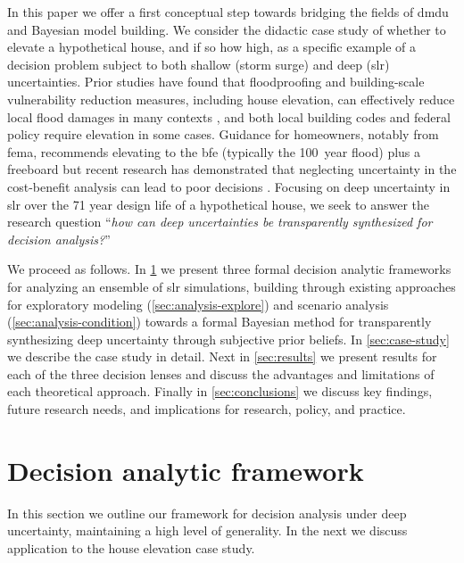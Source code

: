 \documentclass[11pt]{article}
\begin{document}
In this paper we offer a first conceptual step towards bridging the fields of \gls{dmdu} and Bayesian model building.
We consider the didactic case study of whether to elevate a hypothetical house, and if so how high, as a specific example of a decision problem subject to both shallow (storm surge) and deep (\gls{slr}) uncertainties.
Prior studies have found that floodproofing and building-scale vulnerability reduction measures, including house elevation, can effectively reduce local flood damages in many contexts \citep{demoel_reducing:2014,deruig_building:2020,kreibich_building:2005,slotter_floodproofing:2020,rozer_coping:2016,mobley_mitigation:2020,aerts_cost:2018}, and both local building codes \citep{asce_7-10:2013,bruneau_multihazard:2017,asce_24-05:2006} and federal policy \citep{FEMA_p-55:2011} require elevation in some cases.
Guidance for homeowners, notably from \gls{fema}, recommends elevating to the \gls{bfe} (typically the \SI{100}{year} flood) plus a freeboard \citep{fema_retrofitting:2014,asce_24-14:2015,fema_retrofitting:2014} but recent research has demonstrated that neglecting uncertainty in the cost-benefit analysis can lead to poor decisions \citep{zarekarizi_suboptimal:2020}.
Focusing on deep uncertainty in \gls{slr} over the 71 year design life of a hypothetical house, we seek to answer the research question ``\emph{how can deep uncertainties be transparently synthesized for decision analysis?}''

We proceed as follows.
In \cref{sec:analysis} we present three formal decision analytic frameworks for analyzing an ensemble of \gls{slr} simulations, building through existing approaches for exploratory modeling (\cref{sec:analysis-explore}) and scenario analysis (\cref{sec:analysis-condition}) towards a formal Bayesian method for transparently synthesizing deep uncertainty through subjective prior beliefs.
In \cref{sec:case-study} we describe the case study in detail.
Next in \cref{sec:results} we present results for each of the three decision lenses and discuss the advantages and limitations of each theoretical approach.
Finally in \cref{sec:conclusions} we discuss key findings, future research needs, and implications for research, policy, and practice.

\section{Decision analytic framework}\label{sec:analysis}

In this section we outline our framework for decision analysis under deep uncertainty, maintaining a high level of generality.
In the next we discuss application to the house elevation case study.
\end{document}
